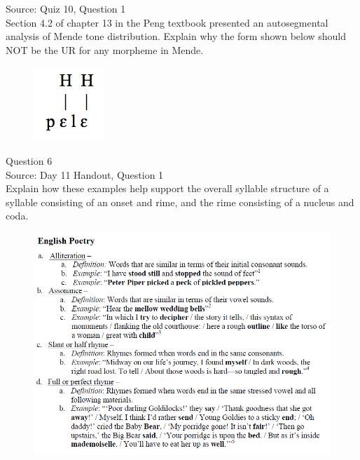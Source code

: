 \documentclass[12pt]{article}
\begin{document}
Source: Quiz 10, Question 1\\

Section 4.2 of chapter 13 in the Peng textbook presented an autosegmental analysis of Mende tone distribution. Explain why the form shown below should NOT be the UR for any morpheme in Mende.\\

\begin{figure}[H]
\includegraphics{../images/mende_house_e.png}
\end{figure}

\newpage

{\large Question 6}\\

Source: Day 11 Handout, Question 1\\

Explain how these examples help support the overall syllable structure of a syllable consisting of an onset and rime, and the rime consisting of a nucleus and coda.\\

\begin{figure}[H]
\includegraphics{../images/english_poetry.png}
\end{figure}

\newpage

\begin{center}
\textbf{{\color{red}{\HUGE END OF EXAM}}}\\

\end{center}
\newpage
\end{document}
